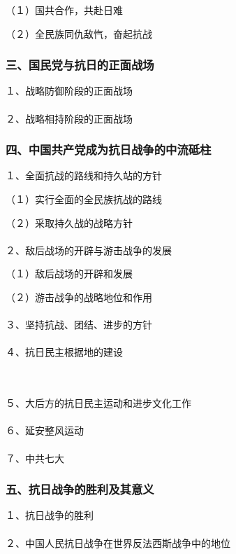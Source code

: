 \documentclass{ctexart}
\begin{document}
（１）国共合作，共赴日难

（２）全民族同仇敌忾，奋起抗战

\subsubsection{三、国民党与抗日的正面战场}
１、战略防御阶段的正面战场
\\\\

２、战略相持阶段的正面战场

\subsubsection{四、中国共产党成为抗日战争的中流砥柱}

１、全面抗战的路线和持久站的方针

（１）实行全面的全民族抗战的路线

（２）采取持久战的战略方针
\\\\

２、敌后战场的开辟与游击战争的发展

（１）敌后战场的开辟和发展

（２）游击战争的战略地位和作用
\\\\

３、坚持抗战、团结、进步的方针
\\\\

４、抗日民主根据地的建设

\\\\
５、大后方的抗日民主运动和进步文化工作
\\\\

６、延安整风运动
\\\\

７、中共七大

\subsubsection{五、抗日战争的胜利及其意义}

１、抗日战争的胜利
\\\\

２、中国人民抗日战争在世界反法西斯战争中的地位
\\\\
\end{document}
